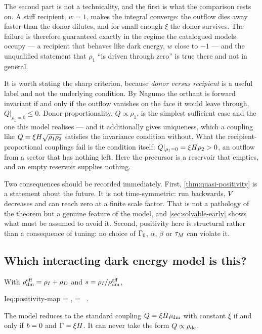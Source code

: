 The second part is not a technicality, and the first is what the comparison
rests on. A stiff recipient, $w=1$, makes the integral converge: the outflow
dies away faster than the donor dilutes, and for small enough $\xi$ the donor
survives. The failure is therefore guaranteed exactly in the regime the
catalogued models occupy --- a recipient that behaves like dark energy, $w$
close to $-1$ --- and the unqualified statement that $\rho_1$ ``is driven
through zero'' is true there and not in general.

It is worth stating the sharp criterion, because \emph{donor versus recipient}
is a useful label and not the underlying condition. By Nagumo the orthant is
forward invariant if and only if the outflow vanishes on the face it would
leave through, $Q|_{\rho_1=0}\le0$. Donor-proportionality, $Q\propto\rho_1$, is
the simplest sufficient case and the one this model realises --- and it
additionally gives uniqueness, which a coupling like $Q=\xi
H\sqrt{\rho_1\rho_2}$ satisfies the invariance condition without. What the
recipient-proportional couplings fail is the condition itself:
$Q|_{\rho_1=0}=\xi H\rho_2>0$, an outflow from a sector that has nothing
left. Here the precursor is a reservoir that empties, and an empty reservoir
supplies nothing.

Two consequences should be recorded immediately. First,
\cref{thm:quasi-positivity} is a statement about the future. It is not
time-symmetric: run backwards, $V$ decreases and can reach zero at a finite
scale factor. That is not a pathology of the theorem but a genuine feature of
the model, and \cref{sec:solvable-early} shows what must be assumed to avoid
it. Second, positivity here is structural rather than a consequence of tuning:
no choice of $\Gamma_{0}$, $\alpha$, $\beta$ or $\tau_{M}$ can violate it.

\subsection{Which interacting dark energy model is this?}
\label{sec:positivity-map}

\begin{proposition}\label{prop:ide-map}
  With $\rho_{\mathrm{dm}}^{\mathrm{eff}}=\rho_{I}+\rho_{D}$ and $s=\rho_{I}/\rho_{\mathrm{dm}}^{\mathrm{eff}}$,
  \begin{keyresult}{I}{eq:positivity-map}
    \QV=\xieff\,\Hub\,\rhodmeff ,
    \qquad
    \xieff=\  .
  \end{keyresult}
  The model reduces to the standard coupling $Q=\xi H\rho_{\rm dm}$ with
  constant $\xi$ if and only if $b=0$ and $\Gamma=\xi H$. It can never
  take the form $Q\propto\rho_{\rm de}$.
\end{proposition}

